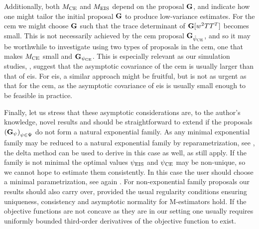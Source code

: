 Additionally, both $M_{{\text{CE}}}$ and $M_{{\text{EIS}}}$ depend on the proposal $\mathbf G$, and indicate how one might tailor the initial proposal $\mathbf G$ to produce low-variance estimates. For the \acrshort{cem} we might choose $\mathbf G$ such that the trace determinant of $\mathbf G [w^{2} TT^{T}]$ becomes small. This is not necessarily achieved by the \acrshort{cem} proposal $\mathbf G_{{\hat\psi_{\text{CE}}}}$, and so it may be worthwhile to investigate using two types of proposals in the \acrshort{cem}, one that makes $M_{{\text{CE}}}$ small and $\mathbf G_{{\psi_{\text{CE}}}}$. This is especially relevant as our simulation studies, , suggest that the asymptotic covariance of the \acrshort{cem} is usually larger than that of \acrshort{eis}. For \acrshort{eis}, a similar approach might be fruitful, but is not as urgent as that for the \acrshort{cem}, as the asymptotic covariance of \acrshort{eis} is usually small enough to be feasible in practice.

Finally, let us stress that these asymptotic considerations are, to the author's knowledge, novel results and should be straightforward to extend if the proposals $\left(\mathbf G_{\psi}\right)_{\psi \in \Psi}$ do not form a natural exponential family. As any minimal exponential family may be reduced to a natural exponential family by reparametrization, see \citep[Theorem 1.9]{Brown1986Fundamentals}, the delta method can be used to derive  in this case as well, as  still apply. If the family is not minimal the optimal values ${\psi_{\text{EIS}}}$ and ${\psi_{\text{CE}}}$ may be non-unique, so we cannot hope to estimate them consistently. In this case the user should choose a minimal parametrization, see again \citep[Theorem 1.9]{Brown1986Fundamentals}. 
For non-exponential family proposals our results should also carry over, provided the usual regularity conditions ensuring uniqueness, consistency and asymptotic normality for M-estimators hold. If the objective functions are not concave as they are in our setting one usually requires uniformly bounded third-order derivatives of the objective function to exist. 

